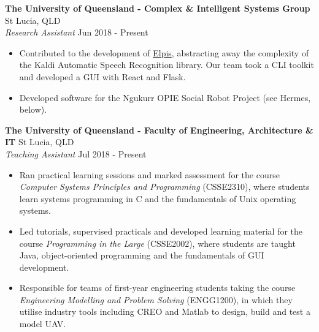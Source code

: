 \documentclass[a4paper]{article}
\newenvironment{myitemize}
{   \small
    \vspace{-2pt}
    \begin{itemize}
    \setlength{\itemsep}{0pt}
    \setlength{\parskip}{0pt}
    \setlength{\parsep}{0pt}     }
{ \end{itemize}                  }
\begin{document}
\textbf{The University of Queensland - Complex \& Intelligent Systems Group} \hfill St Lucia, QLD\\
\textit{Research Assistant} \hfill Jun 2018 - Present\\
\begin{myitemize} \itemsep 0.5mm
	\item Contributed to the development of \href{https://github.com/CoEDL/elpis}{Elpis}, abstracting away the complexity of the Kaldi Automatic Speech Recognition library. Our team took a CLI toolkit and developed a GUI with React and Flask.
	\item Developed software for the Ngukurr OPIE Social Robot Project (see Hermes, below). 
	
\end{myitemize}
\textbf{The University of Queensland - Faculty of Engineering, Architecture \& IT} \hfill St Lucia, QLD\\
\textit{Teaching Assistant} \hfill Jul 2018 - Present\\
\vspace{-0.5mm}
\begin{myitemize} \itemsep 0.5mm
	\item Ran practical learning sessions and marked assessment for the course \textit{Computer Systems Principles and Programming} (CSSE2310),  where students learn systems programming in C and the fundamentals of Unix operating systems.
	\item Led tutorials, supervised practicals and developed learning material for the course \textit{Programming in the Large} (CSSE2002), where students are taught Java, object-oriented programming and the fundamentals of GUI development.
	\item Responsible for teams of first-year engineering students taking the course \textit{Engineering Modelling and Problem Solving} (ENGG1200), in which they utilise industry tools including CREO and Matlab to design, build and test a model UAV.
\end{myitemize}
\end{document}
